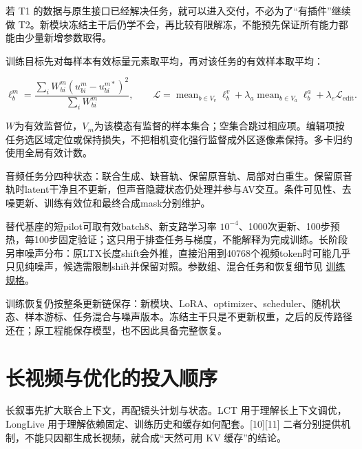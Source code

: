 若 T1 的数据与原生接口已经解决任务，就可以进入交付，不必为了“有插件”继续做 T2。新模块冻结主干后仍学不会，再比较有限解冻，不能预先保证所有能力都能由少量新增参数取得。

训练目标先对每样本有效标量元素取平均，再对该任务的有效样本取平均：

\[
\ell_b^m=\frac{\sum_i W_{bi}^m(u_{bi}^m-u_{bi}^{m*})^2}
{\sum_i W_{bi}^m},\qquad
\mathcal L=\operatorname{mean}_{b\in V_v}\ell_b^v+
\lambda_a\operatorname{mean}_{b\in V_a}\ell_b^a+
\lambda_e\mathcal L_{\mathrm{edit}}.
\]

\(W\)为有效监督位，\(V_m\)为该模态有监督的样本集合；空集合跳过相应项。编辑项按任务选区域定位或保持损失，不把相机变化强行监督成外区逐像素保持。多卡归约使用全局有效计数。

音频任务分四种状态：联合生成、缺音轨、保留原音轨、局部对白重生。保留原音轨时latent干净且不更新，但声音隐藏状态仍处理并参与AV交互。条件可见性、去噪更新、训练有效位和最终合成mask分别维护。

替代基座的短pilot可取有效batch8、新支路学习率 \(10^{-4}\)、1000次更新、100步预热，每100步固定验证；这只用于排查任务与梯度，不能解释为完成训练。长阶段另审噪声分布：原LTX长度shift会外推，直接沿用到40768个视频token时可能几乎只见纯噪声，候选需限制shift并保留对照。参数组、混合任务和恢复细节见 \hyperref[seedance-m25]{训练规格}。

训练恢复仍按整条更新链保存：新模块、LoRA、optimizer、scheduler、随机状态、样本游标、任务混合与噪声版本。冻结主干只是不更新权重，之后的反传路径还在；原工程能保存模型，也不因此具备完整恢复。

\section{长视频与优化的投入顺序}\label{seedance-m27-ux957fux89c6ux9891ux4e0eux4f18ux5316ux7684ux6295ux5165ux987aux5e8f}

长叙事先扩大联合上下文，再配镜头计划与状态。LCT 用于理解长上下文调优，LongLive 用于理解依赖固定、训练历史和缓存如何配套。{[}10{]}{[}11{]} 二者分别提供机制，不能只因都生成长视频，就合成“天然可用 KV 缓存”的结论。


